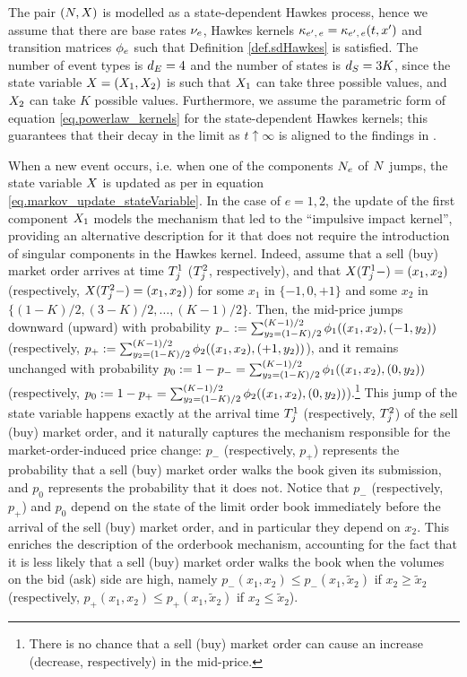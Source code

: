 \documentclass[10pt, article,table]{article}
\begin{document}
The pair $(\multiCountingProc, \stateVariable)$ is modelled as a state-dependent Hawkes process, hence we assume that there are base rates $\baseRate_e$, Hawkes kernels $\hawkesKernel\subscriptee=\hawkesKernel\subscriptee(t, \xone)$ and transition matrices $\transProb_e$ such that  Definition \ref{def.sdHawkes} is satisfied. The number of event types is $\numEventTypes = 4$ and the number of states is $\numStates = 3K$, since the state variable $\stateVariable = (\stateVariable_1, \stateVariable_2)$ is such that $\stateVariable_1$ can take three possible values, and $\stateVariable_2$ can take $K$ possible values. Furthermore, we assume the parametric form of equation \eqref{eq.powerlaw_kernels} for the state-dependent Hawkes kernels; this guarantees that their decay in the limit as $t\uparrow\infty$ is aligned to the findings in \citealp{BM14haw}. 

When a new event occurs, i.e. when one of the components $\countingProc$ of $\multiCountingProc$ jumps, the state variable $\stateVariable$ is updated as per in equation \eqref{eq.markov_update_stateVariable}. In the case of $e=1,2$, the update of the first component $\stateVariable_1$ models the mechanism that led to the ``impulsive impact kernel'', providing an alternative description for it that does not require the introduction of singular components in the Hawkes kernel. Indeed, assume that a sell (buy) market order arrives at time $\arrivalTimes[1]_j$ ($\arrivalTimes[2]_j$, respectively), and that $\stateVariable(\arrivalTimes[1]_j -) = (x_1,x_2)$ (respectively, $\stateVariable(\arrivalTimes[2]_j -) = (x_1,x_2)$) for some $x_1$ in $\lbrace -1, 0, +1\rbrace$ and some $x_2$ in $\lbrace (1-K)/2, (3-K)/2, \dots, (K-1)/2 \rbrace$. Then, the mid-price jumps downward (upward) with probability $p_{-}:=\sum_{y_2 = (1-K)/2}^{(K-1)/2} \transProb_{1}((x_1, x_2), (-1,y_2))$ (respectively, $p_{+}:=\sum_{y_2 = (1-K)/2}^{(K-1)/2} \transProb_{2}((x_1, x_2), (+1,y_2))$), and it remains unchanged with probability $p_{0}:=1-p_{-}=\sum_{y_2 = (1-K)/2}^{(K-1)/2} \transProb_{1}((x_1, x_2), (0,y_2))$  (respectively, $p_{0}:=1-p_{+}=\sum_{y_2 = (1-K)/2}^{(K-1)/2} \transProb_{2}((x_1, x_2), (0,y_2))$).\footnote{ There is no chance that a sell (buy) market order can cause an increase (decrease, respectively) in the mid-price.} This jump of the state variable happens exactly at the arrival time $\arrivalTimes[1]_j$ (respectively, $\arrivalTimes[2]_j$)  of the sell (buy) market order, and it naturally captures the mechanism responsible for the market-order-induced price change: $p_{-}$ (respectively, $p_{+}$) represents the probability that a sell (buy) market order  walks the book given its submission, and $p_{0}$  represents the probability that it does not. Notice that $p_{-}$ (respectively, $p_{+}$) and $p_{0}$ depend on the state of the limit order book immediately before the arrival of the sell (buy) market order, and in particular they depend on $x_2$. This enriches the description of the orderbook mechanism, accounting for the fact that it is less likely that a sell (buy) market order walks the book when the volumes on the bid (ask) side are high, namely $p_{-}(x_1,x_2) \leq p_{-}(x_1,\tilde{x}_2)$ if $x_2\geq \tilde{x}_2$ (respectively, $p_{+}(x_1,x_2) \leq p_{+}(x_1,\tilde{x}_2)$ if $x_2\leq \tilde{x}_2$).
\end{document}
